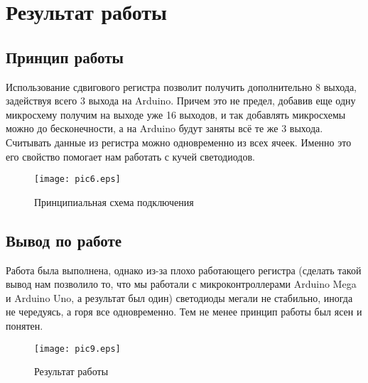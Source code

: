 \documentclass[12pt,a4paper]{scrartcl}
\begin{document}
\section{Результат работы}

\subsection{Принцип работы}
Использование сдвигового регистра позволит получить дополнительно 8  выхода, задействуя всего 3 выхода на Arduino. Причем это не предел, добавив еще одну микросхему получим на выходе уже 16 выходов, и так добавлять микросхемы можно до бесконечности, а на Arduino будут заняты всё те же 3 выхода. Считывать данные из регистра можно одновременно из всех ячеек. Именно это его свойство помогает нам работать с кучей светодиодов.

  \begin{figure}[h!]  
	\centering
	\texttt{[image: pic6.eps]} %
	\caption{Принципиальная схема подключения} 
	\label{image:pic6}
\end{figure}

\newpage

\subsection{Вывод по работе}
Работа была выполнена, однако из-за плохо работающего регистра (сделать такой вывод нам позволило то, что мы работали с микроконтроллерами Arduino Mega и Arduino Uno, а результат был один) светодиоды мегали не стабильно, иногда не чередуясь, а горя все одновременно. Тем не менее принцип работы был ясен и понятен.

  \begin{figure}[h!]  
	\centering
	\texttt{[image: pic9.eps]} %
	\caption{Результат работы} 
	\label{image:pic9}
\end{figure}
\end{document}
